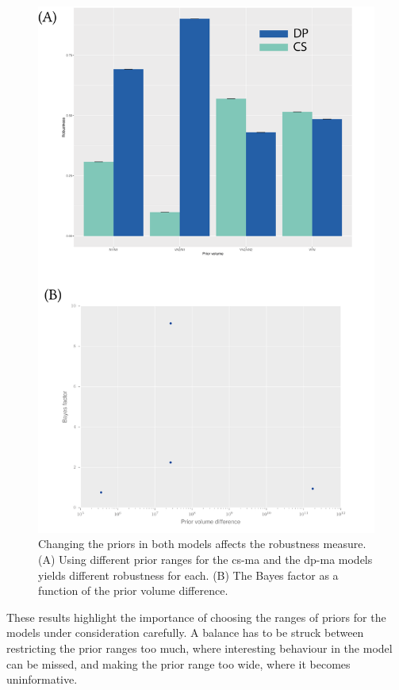 \begin{figure}[h]
\begin{center}
\includegraphics[scale=0.7]{../../chapters/chapterStabilityFinder/images/priors_matter_2.png}
\caption[Changing the priors in both models affects the robustness measure.]{ \label{fig:priors_matter2} Changing the priors in both models affects the robustness measure. (A) Using different prior ranges for the \acrshort{cs-ma} and the \acrshort{dp-ma} models yields different robustness for each. (B) The Bayes factor as a function of the prior volume difference. }
\end{center}
\end{figure}

These results highlight the importance of choosing the ranges of priors for the models under consideration carefully. A balance has to be struck between restricting the prior ranges too much, where interesting behaviour in the model can be missed, and making the prior range too wide, where it becomes uninformative. 

